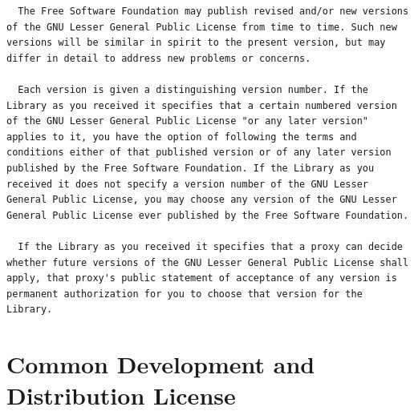 \documentclass[10pt, headsepline,DIV14,BCOR0.5cm]{scrreprt}
\begin{document}
\begin{lstlisting}
  The Free Software Foundation may publish revised and/or new versions
of the GNU Lesser General Public License from time to time. Such new
versions will be similar in spirit to the present version, but may
differ in detail to address new problems or concerns.

  Each version is given a distinguishing version number. If the
Library as you received it specifies that a certain numbered version
of the GNU Lesser General Public License "or any later version"
applies to it, you have the option of following the terms and
conditions either of that published version or of any later version
published by the Free Software Foundation. If the Library as you
received it does not specify a version number of the GNU Lesser
General Public License, you may choose any version of the GNU Lesser
General Public License ever published by the Free Software Foundation.

  If the Library as you received it specifies that a proxy can decide
whether future versions of the GNU Lesser General Public License shall
apply, that proxy's public statement of acceptance of any version is
permanent authorization for you to choose that version for the
Library.

\end{lstlisting}

\section{Common Development and Distribution License}
\end{document}
